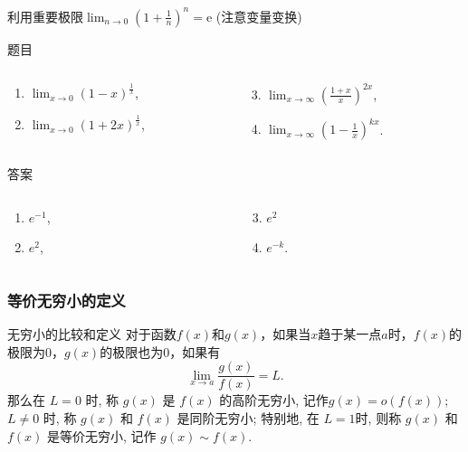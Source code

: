 \documentclass[
10pt,
aspectratio=43,
]{beamer}
\begin{document}
\begin{frame}{利用重要极限$\displaystyle\lim_{n\to0}(1+\frac{1}{n})^n=\mathrm{e}$ (注意变量变换)}
	\begin{block}{题目}
		\begin{columns}[onlytextwidth]
		  \begin{column}{0.5\textwidth}
			\begin{enumerate}
			  \item $\displaystyle\lim _{x \rightarrow 0}(1-x)^{\frac{1}{x}}$,
			  \item $\displaystyle\lim _{x \rightarrow 0}(1+2 x)^{\frac{1}{x}}$,
			\end{enumerate}
		  \end{column}
		  \begin{column}{0.5\textwidth}
			\begin{enumerate}
			  \setcounter{enumi}{2}
			  \item $\displaystyle\lim _{x \rightarrow \infty}\left(\frac{1+x}{x}\right)^{2 x}$,
			  \item $\displaystyle\lim _{x \rightarrow \infty}\left(1-\frac{1}{x}\right)^{k x}$.
			\end{enumerate}
		  \end{column}
		\end{columns}
	  \end{block}
	  \begin{exampleblock}{答案}
		\begin{columns}[onlytextwidth]
			\begin{column}{0.5\textwidth}
				\begin{enumerate}
					\item $e^{-1}$,
					      \pause
					\item $e^2$,
				\end{enumerate}
			\end{column}
			\begin{column}{0.5\textwidth}
				\begin{enumerate}
					\setcounter{enumi}{2}
					\pause
					\item $e^2$
					\pause
					\item $e^{-k}$.
				\end{enumerate}
			\end{column}
		\end{columns}
	\end{exampleblock}
\end{frame}

\begin{frame}
	\frametitle{等价无穷小的定义}
	\begin{block}{无穷小的比较和定义}
		对于函数$f(x)$和$g(x)$，如果当$x$趋于某一点$a$时，$f(x)$的极限为$0$，$g(x)$的极限也为$0$，如果有
		\[
			\lim_{x\to a}\frac{g(x)}{f(x)}=L.
		\]
		那么在 $L=0$ 时, 称 $g(x)$ 是 $f(x)$ 的高阶无穷小, 记作$g(x)= o(f(x))$; $L\neq0$ 时, 称 $g(x)$ 和 $f(x)$ 是同阶无穷小; 特别地, 在 $L=1$时, 则称 $g(x)$ 和 $f(x)$ 是等价无穷小, 记作 $g(x)\sim f(x)$.
	  \end{block}
  \end{frame}
\end{document}
